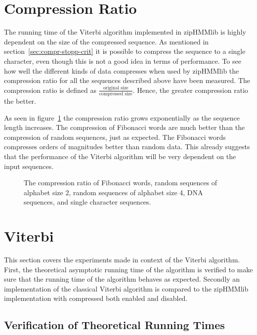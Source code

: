 \section{Compression Ratio}
\label{sec:compression-ratio}

The running time of the Viterbi algorithm implemented in zipHMMlib is highly
dependent on the size of the compressed sequence. As mentioned in
section~\ref{sec:compr-stopp-crit} it is possible to compress the sequence to a
single character, even though this is not a good idea in terms of
performance. To see how well the different kinds of data compresses when used
by zipHMMlib the compression ratio for all the sequences described above have
been measured. The compression ratio is defined as
$\frac{\text{original size}}{\text{compressed size}}$. Hence, the greater
compression ratio the better.

As seen in figure~\ref{fig:compression_ratio} the compression ratio grows
exponentially as the sequence length increases. The compression of Fibonacci
words are much better than the compression of random sequences, just as
expected. The Fibonacci words compresses orders of magnitudes better than
random data. This already suggests that the performance of the Viterbi
algorithm will be very dependent on the input sequences.  

\begin{figure}
  \centering
  
  \caption{The compression ratio of Fibonacci words, random sequences of
    alphabet size 2, random sequences of alphabet size 4, DNA
    sequences, and single character sequences.}
  \label{fig:compression_ratio}
\end{figure}

\section{Viterbi}
\label{sec:viterbi}

This section covers the experiments made in context of the Viterbi
algorithm. First, the theoretical asymptotic running time of the algorithm is
verified to make sure that the running time of the algorithm behaves as
expected. Secondly an implementation of the classical Viterbi algorithm is
compared to the zipHMMlib implementation with compressed both enabled and
disabled.

\subsection{Verification of Theoretical Running Times}
\label{sec:theor-runn-times}

